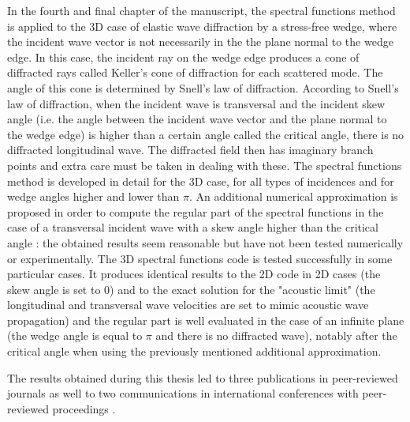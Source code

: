 In the fourth and final chapter of the manuscript, the spectral functions method is applied to the 3D case of elastic wave diffraction by a stress-free wedge, where the incident wave vector is not necessarily in the the plane normal to the wedge edge. In this case, the incident ray on the wedge edge produces a cone of diffracted rays called Keller's cone of diffraction for each scattered mode. The angle of this cone is determined by Snell's law of diffraction. According to Snell's law of diffraction, when the incident wave is transversal and the incident skew angle (i.e. the angle between the incident wave vector and the plane normal to the wedge edge) is higher than a certain angle called the critical angle, there is no diffracted longitudinal wave. The diffracted field then has imaginary branch points and extra care must be taken in dealing with these. The spectral functions method is developed in detail for the 3D case, for all types of incidences and for wedge angles higher and lower than $\pi$. An additional numerical approximation is proposed in order to compute the regular part of the spectral functions in the case of a transversal incident wave with a skew angle higher than the critical angle : the obtained results seem reasonable but have not been tested numerically or experimentally. The 3D spectral functions code is tested successfully in some particular cases. It produces identical results to the 2D code in 2D cases (the skew angle is set to $0$) and to the exact solution for the "acoustic limit" (the longitudinal and transversal wave velocities are set to mimic acoustic wave propagation) and the regular part is well evaluated in the case of an infinite plane (the wedge angle is equal to $\pi$ and there is no diffracted wave), notably after the critical angle when using the previously mentioned additional approximation.

The results obtained during this thesis led to three publications in peer-reviewed journals \cite{article, articleelasto, articleITD} as well to two communications in international conferences with peer-reviewed proceedings \cite{DD2018,AFPAC}.

